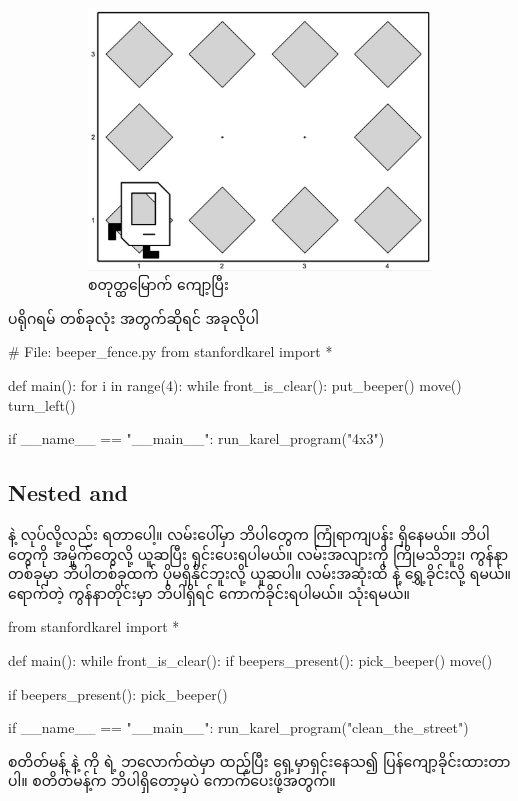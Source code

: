 \begin{figure}[tbh!]
\begin{subfigure}[t]{{\figpctw}\textwidth}
        \includegraphics[scale=\figscale]{images/ch02/beeper_fence/4th_iter.jpg}
        \caption{စတုတ္ထမြောက် ကျော့ပြီး}    
    \end{subfigure}   
    \caption{}
    \label{fig:beeper_fence_iters}
\end{figure}

ပရိုဂရမ် တစ်ခုလုံး အတွက်ဆိုရင် အခုလိုပါ
%
\begin{py}
# File: beeper_fence.py
from stanfordkarel import *


def main():
    for i in range(4):
        while front_is_clear():
            put_beeper()
            move()
        turn_left()


if __name__ == "__main__":
    run_karel_program("4x3")

\end{py}
%

\subsection*{Nested  and }
 နဲ့   လုပ်လို့လည်း ရတာပေါ့။ လမ်းပေါ်မှာ ဘိပါတွေက ကြုံရာကျပန်း  ရှိနေမယ်။ ဘိပါတွေကို အမှိုက်တွေလို့ ယူဆပြီး ရှင်းပေးရပါမယ်။ လမ်းအလျားကို ကြိုမသိဘူး၊ ကွန်နာတစ်ခုမှာ ဘိပါတစ်ခုထက် ပိုမရှိနိုင်ဘူးလို့ ယူဆပါ။  လမ်းအဆုံးထိ   နဲ့ ရွှေ့ခိုင်းလို့ ရမယ်။ ရောက်တဲ့ ကွန်နာတိုင်းမှာ ဘိပါရှိရင် ကောက်ခိုင်းရပါမယ်။  သုံးရမယ်။
%
\begin{py}
from stanfordkarel import *


def main():
    while front_is_clear():
        if beepers_present():
            pick_beeper()
        move()

    if beepers_present():
        pick_beeper()


if __name__ == "__main__":
    run_karel_program("clean_the_street")

\end{py}
%
 စတိတ်မန့် နဲ့  ကို   ရဲ့ ဘလောက်ထဲမှာ ထည့်ပြီး ရှေ့မှာရှင်းနေသ၍ ပြန်ကျော့ခိုင်းထားတာပါ။  စတိတ်မန့်က ဘိပါရှိတော့မှပဲ ကောက်ပေးဖို့အတွက်။

